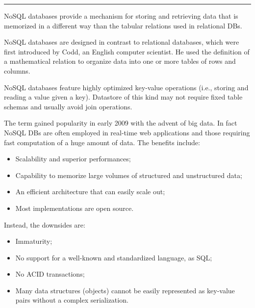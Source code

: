 	\begin{mdframed}[style=indepth]
		\begingroup
		\setlength{\fboxsep}{0pt}%
		\colorbox{black!50!white}{}
		\endgroup
		\hrule\vspace*{2mm}
		\hspace{.03\linewidth}\begin{minipage}{.94\linewidth}
NoSQL databases provide a mechanism for storing and retrieving data that is memorized in a different way than the tabular relations used in relational DBs. 

NoSQL databases are designed in contrast to relational databases, which were first introduced by Codd, an English computer scientist. He used the definition of a mathematical relation to organize data into one or more tables of rows and columns.

NoSQL databases feature highly optimized key-value operations (i.e., storing and reading a value given a key). Datastore of this kind may not require fixed table schemas and usually avoid join operations.

The term gained popularity in early 2009 with the advent of big data. In fact NoSQL DBs are often employed in real-time web applications and those requiring fast computation of a huge amount of data.
The benefits include:
\begin{itemize}
\item Scalability and superior performances;
\item Capability to memorize large volumes of structured and unstructured data;
\item An efficient architecture that can easily scale out;
\item Most implementations are open source.
\end{itemize}
Instead, the downsides are:
\begin{itemize}
\item Immaturity;
\item No support for a well-known and standardized language, as SQL;
\item No ACID transactions;
\item Many data structures (objects) cannot be easily represented as key-value pairs without a complex serialization.
\end{itemize}
		\end{minipage}
	\end{mdframed}


